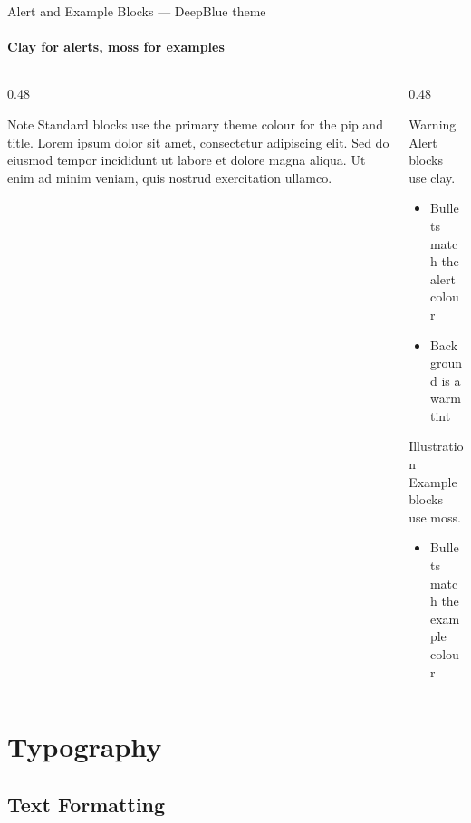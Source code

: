 \documentclass[aspectratio=169]{beamer}
\begin{document}
{
\begin{frame}{Alert and Example Blocks — DeepBlue theme}
  \framesubtitle{Clay for alerts, moss for examples}
  \begin{columns}[T]
    \begin{column}{0.48\textwidth}
      \begin{block}{Note}
        Standard blocks use the primary theme colour for the pip
        and title. Lorem ipsum dolor sit amet, consectetur
        adipiscing elit. Sed do eiusmod tempor incididunt ut
        labore et dolore magna aliqua. Ut enim ad minim veniam,
        quis nostrud exercitation ullamco.
      \end{block}
    \end{column}
    \begin{column}{0.48\textwidth}
      \begin{alertblock}{Warning}
        Alert blocks use clay.
        \begin{itemize}
          \item Bullets match the alert colour
          \item Background is a warm tint
        \end{itemize}
      \end{alertblock}
      \begin{exampleblock}{Illustration}
        Example blocks use moss.
        \begin{itemize}
          \item Bullets match the example colour
        \end{itemize}
      \end{exampleblock}
    \end{column}
  \end{columns}
\end{frame}
}

\section{Typography}

\subsection{Text Formatting}
\end{document}

